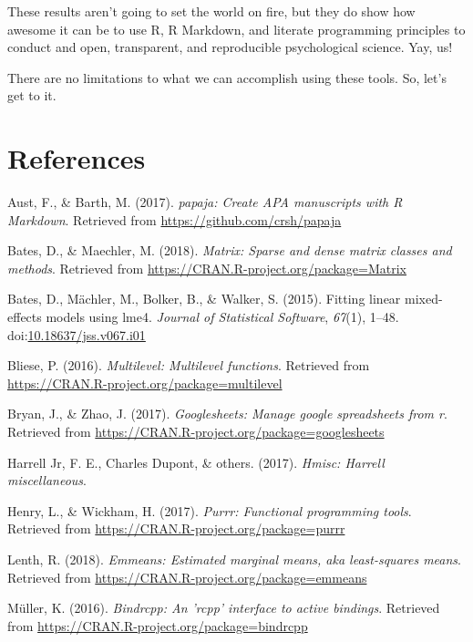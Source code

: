 \documentclass[english,man]{apa6}
\theoremstyle{definition}
\theoremstyle{definition}
\theoremstyle{definition}
\theoremstyle{remark}
\begin{document}
These results aren't going to set the world on fire, but they do show
how awesome it can be to use R, R Markdown, and literate programming
principles to conduct and open, transparent, and reproducible
psychological science. Yay, us!

There are no limitations to what we can accomplish using these tools.
So, let's get to it.

\newpage

\section{References}\label{references}

\setlength{\parindent}{-0.5in} \setlength{\leftskip}{0.5in}

\hypertarget{refs}{}
\hypertarget{ref-R-papaja}{}
Aust, F., \& Barth, M. (2017). \emph{papaja: Create APA manuscripts with
R Markdown}. Retrieved from \url{https://github.com/crsh/papaja}

\hypertarget{ref-R-Matrix}{}
Bates, D., \& Maechler, M. (2018). \emph{Matrix: Sparse and dense matrix
classes and methods}. Retrieved from
\url{https://CRAN.R-project.org/package=Matrix}

\hypertarget{ref-R-lme4}{}
Bates, D., Mächler, M., Bolker, B., \& Walker, S. (2015). Fitting linear
mixed-effects models using lme4. \emph{Journal of Statistical Software},
\emph{67}(1), 1--48.
doi:\href{https://doi.org/10.18637/jss.v067.i01}{10.18637/jss.v067.i01}

\hypertarget{ref-R-multilevel}{}
Bliese, P. (2016). \emph{Multilevel: Multilevel functions}. Retrieved
from \url{https://CRAN.R-project.org/package=multilevel}

\hypertarget{ref-R-googlesheets}{}
Bryan, J., \& Zhao, J. (2017). \emph{Googlesheets: Manage google
spreadsheets from r}. Retrieved from
\url{https://CRAN.R-project.org/package=googlesheets}

\hypertarget{ref-R-Hmisc}{}
Harrell Jr, F. E., Charles Dupont, \& others. (2017). \emph{Hmisc:
Harrell miscellaneous}.

\hypertarget{ref-R-purrr}{}
Henry, L., \& Wickham, H. (2017). \emph{Purrr: Functional programming
tools}. Retrieved from \url{https://CRAN.R-project.org/package=purrr}

\hypertarget{ref-R-emmeans}{}
Lenth, R. (2018). \emph{Emmeans: Estimated marginal means, aka
least-squares means}. Retrieved from
\url{https://CRAN.R-project.org/package=emmeans}

\hypertarget{ref-R-bindrcpp}{}
Müller, K. (2016). \emph{Bindrcpp: An 'rcpp' interface to active
bindings}. Retrieved from
\url{https://CRAN.R-project.org/package=bindrcpp}
\end{document}
